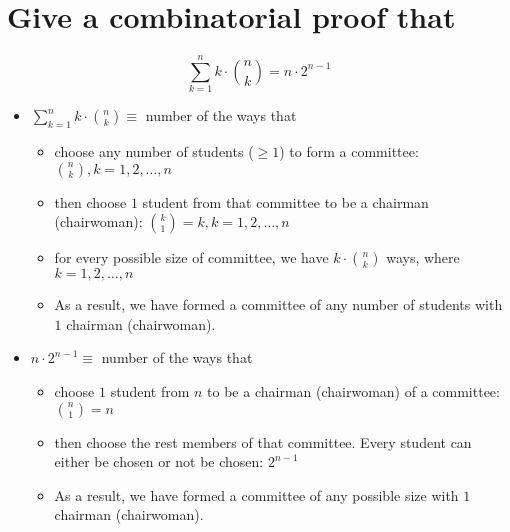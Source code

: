 \documentclass[a4paper]{article}
\begin{document}
\section{Give a combinatorial proof that}
$$
\sum_{k=1}^n k\cdot \binom{n}{k} = n \cdot 2^{n-1}
$$
\begin{itemize}
    \item $\sum_{k=1}^n k\cdot \binom{n}{k}\equiv$ number of the ways that 
        \begin{itemize}
            \item choose any number of students ($\geq1$) to form a committee: $\binom{n}{k}, k=1,2,\dots,n$
            \item then choose $1$ student from that committee to be a chairman (chairwoman): $\binom{k}{1}=k, k=1,2,\dots,n$
            \item for every possible size of committee, we have $k\cdot\binom{n}{k}$ ways, where $k=1,2,\dots,n$
            \item As a result, we have formed a committee of any number of students with $1$ chairman (chairwoman).
        \end{itemize}
    \item $n \cdot 2^{n-1}\equiv$ number of the ways that 
        \begin{itemize}
            \item choose $1$ student from $n$ to be a chairman (chairwoman) of a committee: $\binom{n}{1}=n$
            \item then choose the rest members of that committee. Every student can either be chosen or not be chosen: $2^{n-1}$
            \item As a result, we have formed a committee of any possible size with $1$ chairman (chairwoman).
        \end{itemize}
\end{itemize}
\end{document}
